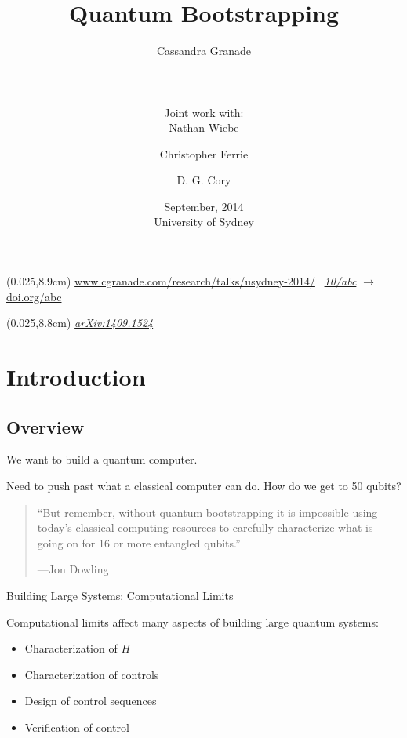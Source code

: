 \documentclass[xcolor=dvipsnames, compress]{beamer}
\title{Quantum Bootstrapping}
\author[Granade, Wiebe, Ferrie and Cory]{
  Cassandra Granade  \\
  \rule{0.35\textwidth}{0.125pt}\\
  {\footnotesize Joint work with:}\\
  Nathan Wiebe \and
  Christopher Ferrie \and
  D. G. Cory
}
\institute[IQC]{
  Institute for Quantum Computing\\
  {University of Waterloo, Ontario, Canada}
}
\date[September 2014]{
  September, 2014 \\
  {\footnotesize University of Sydney}
}
\renewcommand\UrlFont{\color{red}\rmfamily\itshape}
\newcommand{\shortdoi}[1]{\href{http://doi.org/#1}{\UrlFont 10/#1}}
\newcommand{\bottomnote}[1]{
  \begin{textblock*}{0.95\paperwidth} (0.025\paperwidth,8.9cm)
    {\tiny \hfill #1}
  \end{textblock*}
}
\begin{document}
\begin{frame}[plain]
  \titlepage
  \bottomnote{\url{www.cgranade.com/research/talks/usydney-2014/} \textbullet~\shortdoi{abc} $\to$ \url{doi.org/abc}}

  \begin{textblock*}{0.95\paperwidth} (0.025\paperwidth,8.8cm)
    {\href{https://scirate.com/arxiv/1409.1524}{\UrlFont{arXiv:1409.1524}}}
  \end{textblock*}
\end{frame}

\section{Introduction}
\subsection{Overview}

\begin{frame}
  
  \begin{block}{}
    We want to build a quantum computer.
  \end{block}

  \pause

  Need to push past what a classical computer can do.
  How do we get to 50 qubits?

\end{frame}

\begin{frame}

  \begin{quote}{}
    ``But remember, without quantum bootstrapping it is impossible using today’s classical computing resources to carefully characterize what is going on for 16 or more entangled qubits.''

    \hfill\normalfont---Jon Dowling
  \end{quote}

\end{frame}

\begin{frame}{Building Large Systems: Computational Limits}

  Computational limits affect many aspects of building
  large quantum systems:

  \begin{itemize}[<+->]
    \item Characterization of $H$
    \item Characterization of controls
    \item Design of control sequences
    \item Verification of control
  \end{itemize}


\end{frame}
\end{document}
